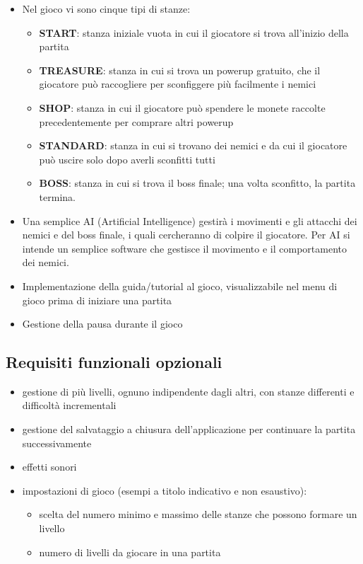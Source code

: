 \documentclass[a4paper,12pt]{report}
\begin{document}
\begin{itemize}
    \item Nel gioco vi sono cinque tipi di stanze:
    \begin{itemize}
        \item \textbf{START}: stanza iniziale vuota in cui il giocatore si trova all'inizio della partita
        \item \textbf{TREASURE}: stanza in cui si trova un powerup gratuito, che il giocatore può raccogliere per sconfiggere più facilmente i nemici
        \item \textbf{SHOP}: stanza in cui il giocatore può spendere le monete raccolte precedentemente per comprare altri powerup
        \item \textbf{STANDARD}: stanza in cui si trovano dei nemici e da cui il giocatore può uscire solo dopo averli sconfitti tutti
        \item \textbf{BOSS}: stanza in cui si trova il boss finale; una volta sconfitto, la partita termina.
    \end{itemize}
    \item Una semplice AI (Artificial Intelligence) gestirà i movimenti e gli attacchi dei nemici e del boss finale, i quali cercheranno di colpire il giocatore. Per AI si intende un semplice software che gestisce il movimento e il comportamento dei nemici.
    \item Implementazione della guida/tutorial al gioco, visualizzabile nel menu di gioco prima di iniziare una partita
    \item Gestione della pausa durante il gioco
\end{itemize}

\subsection*{Requisiti funzionali opzionali}
\begin{itemize}
    \item gestione di più livelli, ognuno indipendente dagli altri, con stanze differenti e difficoltà incrementali
    \item gestione del salvataggio a chiusura dell'applicazione per continuare la partita successivamente
    \item effetti sonori
    \item impostazioni di gioco (esempi a titolo indicativo e non esaustivo): \begin{itemize}
        \item scelta del numero minimo e massimo delle stanze che possono formare un livello
        \item numero di livelli da giocare in una partita
    \end{itemize} 
\end{itemize}
\end{document}
